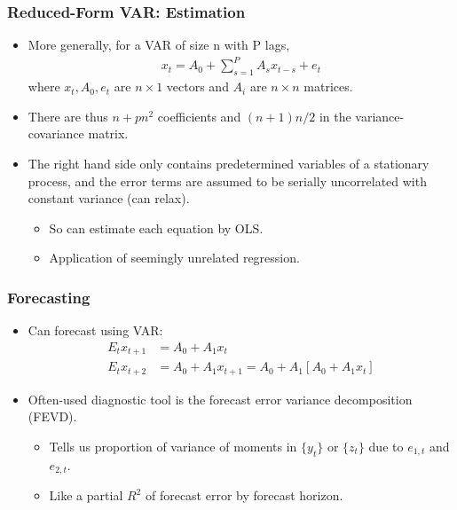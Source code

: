 \documentclass[english,xcolor=svgnames]{beamer}
\begin{document}
\begin{frame}
\frametitle{Reduced-Form VAR: Estimation}
\begin{itemize}
	\item More generally, for a VAR of size n with P lags,
	\begin{align*}
		x_t = A_0+\sum_{s=1}^P A_s x_{t-s}+e_t
	\end{align*}
	where $x_t,A_0,e_t$ are $n\times1$ vectors and $A_i$ are $n\times n$ matrices.
	\item There are thus $n + pn^2 $ coefficients and $(n + 1) n/2 $ in the variance-covariance matrix.
	\item The right hand side only contains predetermined variables of a stationary process, and the error terms are assumed to be serially uncorrelated with constant variance (can relax).
	\begin{itemize}
		\item So can estimate each equation by OLS.
		\item Application of seemingly unrelated regression.
	\end{itemize}
\end{itemize}
\end{frame}


\begin{frame}
\frametitle{Forecasting
}
\begin{itemize}
	\item Can forecast using VAR:
	\begin{align*}
		E_t x_{t+1} &= A_0+A_1x_t \\
		E_t x_{t+2} &= A_0+A_1x_{t+1} =  A_0+A_1[A_0+A_1x_t]
	\end{align*}
	\item Often-used diagnostic tool is the forecast error variance
decomposition (FEVD).
\begin{itemize}
	\item Tells us proportion of variance of moments in $\{y_t\}$ or $\{z_t\}$ due to $e_{1,t}$ and $e_{2,t}$.
	\item Like a partial $R^2$ of forecast error by forecast horizon.
\end{itemize}
\end{itemize}
\end{frame}
\end{document}
